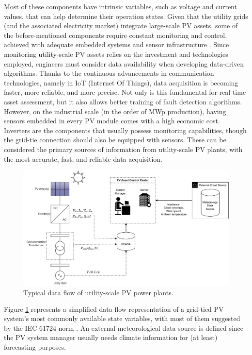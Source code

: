 Most of these components have intrinsic variables, such as voltage and current values, that can help determine their operation states. Given that the utility grids (and the associated electricity market) integrate large-scale PV assets, some of the before-mentioned components require constant monitoring and control, achieved with adequate embedded systems and sensor infrastructure \cite{AIPV}. Since monitoring utility-scale PV assets relies on the investment and technologies employed, engineers must consider data availability when developing data-driven algorithms. Thanks to the continuous advancements in communication technologies, namely in IoT (Internet Of Things), data acquisition is becoming faster, more reliable, and more precise. Not only is this fundamental for real-time asset assessment, but it also allows better training of fault detection algorithms. However, on the industrial scale (in the order of MWp production), having sensors embedded in every PV module comes with a high economic cost. Inverters are the components that usually possess monitoring capabilities, though the grid-tie connection should also be equipped with sensors. These can be considered the primary sources of information from utility-scale PV plants, with the most accurate, fast, and reliable data acquisition.

\begin{figure}[h!]
    \centering
    \includegraphics[width=\linewidth]{figures/chapter2/pvdata.drawio.pdf}
    \caption{Typical data flow of utility-scale PV power plants.}
    \label{fig:pvdataflow}
\end{figure}

Figure \ref{fig:pvdataflow} represents a simplified data flow representation of a grid-tied PV system's most commonly available state variables, with most of them suggested by the IEC 61724 norm \cite{iec61724}. An external meteorological data source is defined since the PV system manager usually needs climate information for (at least) forecasting purposes.


